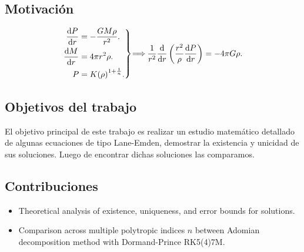 \documentclass{GEM-JNL-FMP}
\theoremstyle{definition}
\numberwithin{equation}{section}
\begin{document}
\subsection{Motivación}
\begin{equation*}
    \left.\begin{aligned}
        \diff{P}{r} & = -\frac{GM\rho}{r^{2}}.                \\
        \diff{M}{r} & = 4\pi r^{2}\rho.                       \\
        P           & = K{\left(\rho\right)}^{1+\frac{1}{n}}.
        \end{aligned}\right\}
            \!\!\!\implies\!\!\!
        \begin{aligned}
            \frac{1}{r^{2}}
            \diff*{
                \left(
                    \frac{r^{2}}{\rho}\diff{P}{r}
                \right)
            }{r}=
            -4\pi G \rho.
        \end{aligned}
\end{equation*}

\subsection{Objetivos del trabajo}

El objetivo principal de este trabajo es realizar un estudio matemático detallado de algunas 
ecuaciones de tipo Lane-Emden, demostrar la existencia y unicidad de sus soluciones.
Luego de encontrar dichas soluciones las comparamos.

\subsection{Contribuciones}
\begin{itemize}
    \item   Theoretical analysis of existence, uniqueness, and error bounds for solutions.
    \item   Comparison across multiple polytropic indices $n$ between Adomian decomposition method with Dormand-Prince RK5(4)7M.
\end{itemize}


\end{document}
